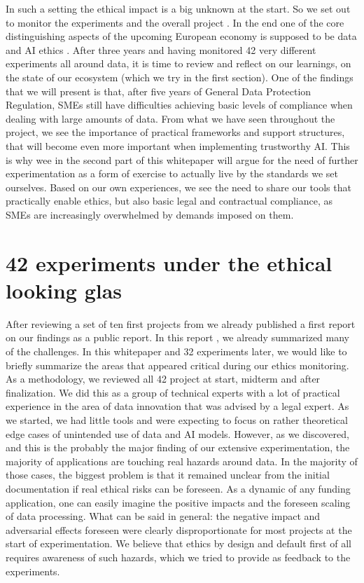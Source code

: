 In such a setting the ethical impact is a big unknown at the start. So we set out to monitor the experiments and the overall project \cite{D3.1}. In the end one of the core distinguishing aspects of the upcoming European economy is supposed to be data and AI ethics \cite{some digital strategy}.  After three years and having
monitored 42 very different experiments all around data, it is time to review and reflect on our learnings, on the state of our ecosystem (which we try in the first section). One of the findings that we will present is that, after five years of General Data Protection Regulation, SMEs still have difficulties achieving basic levels of compliance when dealing with large amounts of data. From what we have seen throughout the project, we see the importance of practical frameworks and support structures, that will become even more important when implementing trustworthy AI. This is why wee in the second part of this whitepaper will argue for the need of further experimentation as a form of exercise to actually live by the standards we set ourselves. Based on our own experiences, we see the need to share our tools that practically enable ethics, 
but also basic legal and contractual compliance, as SMEs are increasingly overwhelmed by demands imposed on them.


\section{42 experiments under the ethical looking glas}\label{}

After reviewing a set of ten first projects from we already published a first report on our findings as a public report. In this report \cite{DXX}, 
we already summarized many of the challenges. In this whitepaper and 32 experiments later, we would like to briefly summarize the areas that appeared critical during our ethics monitoring.
As a methodology, we reviewed all 42 project at start, midterm and after finalization. We did this as a group of technical experts with a lot of practical experience in the area of data innovation that was advised by a legal expert. As we started, we had little tools and were expecting to focus on rather theoretical edge cases of unintended use of data and AI models. However, as we discovered, and this is the probably the major finding of our extensive experimentation, the majority of applications are touching real hazards around data. In the majority of those cases, the biggest problem is that it remained unclear from the initial documentation if real ethical risks can be foreseen. As a dynamic of any funding application, one can easily imagine the positive impacts and the foreseen scaling of data processing. What can be said in general: the negative impact and adversarial effects foreseen were clearly disproportionate for most projects at the start of experimentation. We believe that ethics by design and default first of all requires awareness of such hazards, which we tried to provide as feedback to the experiments.